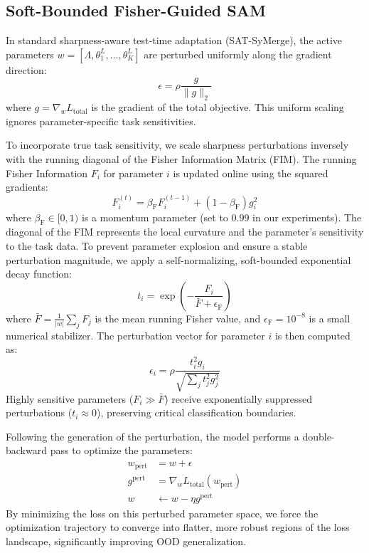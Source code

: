 \documentclass{article}
\begin{document}
\subsection{Soft-Bounded Fisher-Guided SAM}
In standard sharpness-aware test-time adaptation (SAT-SyMerge), the active parameters $w = [\Lambda, \theta^L_1, \dots, \theta^L_K]$ are perturbed uniformly along the gradient direction:
\begin{equation}
    \epsilon = \rho \frac{g}{\|g\|_2}
\end{equation}
where $g = \nabla_w L_{\text{total}}$ is the gradient of the total objective. This uniform scaling ignores parameter-specific task sensitivities.

To incorporate true task sensitivity, we scale sharpness perturbations inversely with the running diagonal of the Fisher Information Matrix (FIM). The running Fisher Information $F_i$ for parameter $i$ is updated online using the squared gradients:
\begin{equation}
    F_i^{(t)} = \beta_{\text{F}} F_i^{(t-1)} + (1 - \beta_{\text{F}}) g_i^2
\end{equation}
where $\beta_{\text{F}} \in [0, 1)$ is a momentum parameter (set to $0.99$ in our experiments). The diagonal of the FIM represents the local curvature and the parameter's sensitivity to the task data. To prevent parameter explosion and ensure a stable perturbation magnitude, we apply a self-normalizing, soft-bounded exponential decay function:
\begin{equation}
    t_i = \exp \left( - \frac{F_i}{\bar{F} + \epsilon_{\text{F}}} \right)
\end{equation}
where $\bar{F} = \frac{1}{|w|} \sum_{j} F_j$ is the mean running Fisher value, and $\epsilon_{\text{F}} = 10^{-8}$ is a small numerical stabilizer. The perturbation vector for parameter $i$ is then computed as:
\begin{equation}
    \epsilon_i = \rho \frac{t_i^2 g_i}{\sqrt{\sum_j t_j^2 g_j^2}}
\end{equation}
Highly sensitive parameters ($F_i \gg \bar{F}$) receive exponentially suppressed perturbations ($t_i \approx 0$), preserving critical classification boundaries.

Following the generation of the perturbation, the model performs a double-backward pass to optimize the parameters:
\begin{align}
    w_{\text{pert}} &= w + \epsilon \\
    g^{\text{pert}} &= \nabla_w L_{\text{total}}(w_{\text{pert}}) \\
    w &\leftarrow w - \eta g^{\text{pert}}
\end{align}
By minimizing the loss on this perturbed parameter space, we force the optimization trajectory to converge into flatter, more robust regions of the loss landscape, significantly improving OOD generalization.
\end{document}
